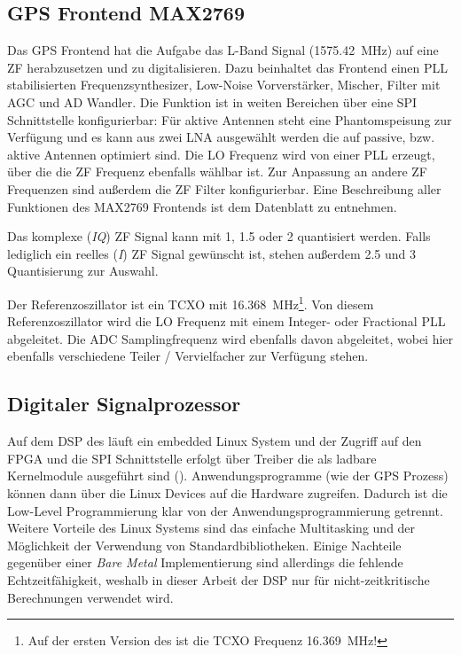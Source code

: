 \subsection{GPS Frontend MAX2769}
\label{max2769frontend}
Das GPS Frontend hat die Aufgabe das L-Band Signal (\SI{1575.42}{\MHz}) auf eine \gls{ZF} herabzusetzen und zu digitalisieren. Dazu beinhaltet das Frontend einen PLL stabilisierten Frequenzsynthesizer, Low-Noise Vorverstärker, Mischer, Filter mit \gls{AGC} und AD Wandler. Die Funktion ist in weiten Bereichen über eine SPI Schnittstelle konfigurierbar: Für aktive Antennen steht eine Phantomspeisung zur Verfügung und es kann aus zwei \gls{LNA} ausgewählt werden die auf passive, bzw. aktive Antennen optimiert sind. Die \gls{LO} Frequenz wird von einer PLL erzeugt, über die die ZF Frequenz ebenfalls wählbar ist. Zur Anpassung an andere ZF Frequenzen sind außerdem die ZF Filter konfigurierbar. Eine Beschreibung aller Funktionen des MAX2769 Frontends ist dem Datenblatt \cite{max2769} zu entnehmen.

Das komplexe (\emph{IQ}) ZF Signal kann mit \SI{1}{\bit}, \SI{1.5}{\bit} oder \SI{2}{\bit}  quantisiert werden. Falls lediglich ein reelles (\emph{I}) ZF Signal gewünscht ist, stehen außerdem  \SI{2.5}{\bit} und \SI{3}{\bit} Quantisierung zur Auswahl.

Der Referenzoszillator ist ein \gls{TCXO} mit \SI{16.368}{MHz}\footnote{Auf der ersten Version des \comboard ist die TCXO Frequenz \SI{16.369}{MHz}!}. Von diesem Referenzoszillator wird die LO Frequenz mit einem Integer- oder Fractional PLL abgeleitet. Die ADC Samplingfrequenz wird ebenfalls davon abgeleitet, wobei hier ebenfalls verschiedene Teiler / Vervielfacher zur Verfügung stehen.


\subsection{Digitaler Signalprozessor}
Auf dem \gls{DSP} des \comboard läuft ein embedded Linux System und der Zugriff auf den FPGA und die SPI Schnittstelle erfolgt über Treiber die als ladbare Kernelmodule ausgeführt sind (). Anwendungsprogramme (wie der GPS Prozess) können dann über die Linux Devices auf die Hardware zugreifen. Dadurch ist die Low-Level Programmierung klar von der Anwendungsprogrammierung getrennt. Weitere Vorteile des Linux Systems sind das einfache Multitasking und der Möglichkeit der Verwendung von Standardbibliotheken. Einige Nachteile gegenüber einer \emph{Bare Metal} Implementierung sind allerdings die fehlende Echtzeitfähigkeit, weshalb in dieser Arbeit der DSP nur für nicht-zeitkritische Berechnungen verwendet wird.

